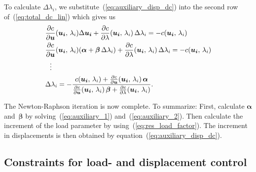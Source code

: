 %
To calculate $\Delta \lambda_i$, we substitute~(\ref{eq:auxiliary_disp_dc}) into the second row of~(\ref{eq:total_dc_lin}) which gives us
%
\begin{align}
&\frac{\partial c}{\partial \boldsymbol{u}}(\boldsymbol{u_{i}},\,\lambda_{i})\Delta\boldsymbol{u_{i}} + \frac{\partial c}{\partial \lambda}(\boldsymbol{u_{i}},\,\lambda_{i})\,\Delta \lambda_{i} = -c(\boldsymbol{u_{i}},\,\lambda_{i})\notag\\
&\frac{\partial c}{\partial \boldsymbol{u}}(\boldsymbol{u_{i}},\,\lambda_{i})(\boldsymbol{\alpha} + \boldsymbol{\beta}\,\Delta \lambda_{i}) + \frac{\partial c}{\partial \lambda}(\boldsymbol{u_{i}},\,\lambda_{i})\,\Delta \lambda_{i} = -c(\boldsymbol{u_{i}},\,\lambda_{i})\notag\\
&\ \ \vdots\notag\\
&\Delta \lambda_{i} = -\frac{c(\boldsymbol{u_{i}},\,\lambda_{i}) + \frac{\partial c}{\partial \boldsymbol{u}}(\boldsymbol{u_{i}},\,\lambda_{i})\,\boldsymbol{\alpha}}{\frac{\partial c}{\partial \boldsymbol{u}}(\boldsymbol{u_{i}},\,\lambda_{i})\,\boldsymbol{\beta} + \frac{\partial c}{\partial \lambda}(\boldsymbol{u_{i}},\,\lambda_{i})}.\label{eq:res_load_factor}
\end{align}

The Newton-Raphson iteration is now complete. To summarize: First, calculate $\boldsymbol{\alpha}$ and~$\boldsymbol{\beta}$ by solving~(\ref{eq:auxiliary_1}) and~(\ref{eq:auxiliary_2}). Then calculate the increment of the load parameter by using~(\ref{eq:res_load_factor}). The increment in displacements is then obtained by equation~(\ref{eq:auxiliary_disp_dc}).\\

\subsection{Constraints for load- and displacement control}

